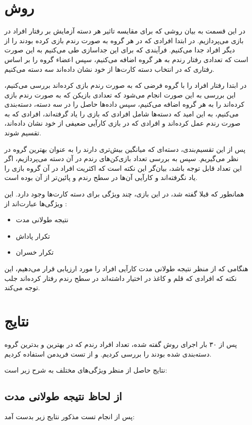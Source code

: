 \documentclass{article}
\begin{document}
\section{روش}
در این قسمت به بیان روشی که برای مقایسه تاثیر هر دسته آزمایش  بر رفتار افراد در بازی می‌پردازیم.
در ابتدا افرادی که در هر گروه به صورت رندم بازی کرده بودند را از دیگر افراد جدا می‌کنیم. فرآیندی که برای این جداسازی طی می‌کنیم به این صورت است که 
تعدادی رفتار رندم به هر گروه اضافه می‌کنیم، سپس اعضاء گروه را بر اساس رفتاری که در انتخاب دسته‌ کارت‌ها از خود نشان داده‌اند سه دسته می‌کنیم.

در ابتدا رفتار افراد را با گروه فرضی که به صورت رندم بازی کرده‌اند بررسی می‌کنیم، این بررسی به این صورت انجام می‌شود که 
تعدادی بازیکن که به صورت رندم بازی کرده‌اند را به هر گروه اضافه می‌کنیم، سپس داده‌ها حاصل را در سه دسته، دسته‌بندی می‌کنیم،
به این امید که دسته‌ها شامل افرادی که بازی را یاد گرفته‌اند، افرادی که به صورت رندم عمل کرده‌اند و افرادی که 
در بازی کارآیی ضعیفی از خود نشان داده‌اند، تقسیم شوند.

پس از این تقسیم‌بندی، دسته‌ای که میانگین بیش‌تری دارند را به عنوان بهترین گروه در نظر می‌گیریم.
سپس به بررسی تعداد بازی‌کن‌های رندم در آن دسته می‌پردازیم، اگر 
این تعداد قابل توجه باشد، بیان‌گر این نکته است که اکثریت افراد در آن گروه بازی را یاد نگرفته‌اند
 و کارآیی آن‌ها در سطح رندم و پائین‌تر از آن بوده است.


همانطور که قبلا گفته شد، در این بازی، چند ویژگی برای دسته کارت‌ها وجود دارد. این ویژگی‌ها عبارت‌اند از :
\begin{itemize}
 \item نتیجه طولانی مدت
\item تکرار پاداش‌
\item تکرار خسران‌
\end{itemize}

هنگامی که از منظر نتیجه طولانی مدت کارآیی افراد را مورد ارزیابی قرار می‌دهیم،
  این نکته که افرادی که قلم و کاغذ در اختیار داشته‌اند
در سطح رندم رفتار کرده‌اند جلب توجه می‌کند.


\section{نتایج}
پس از ۳۰ بار اجرای روش گفته شده، تعداد افراد رندم که در بهترین و بدترین گروه دسته‌بندی شده بودند را بررسی کردیم.
و از تست فریدمن استفاده کردیم.

نتایج حاصل از منظر ویژگی‌های مختلف به شرح زیر است:
\subsection{از لحاظ نتیجه طولانی مدت}
پس از انجام تست مذکور نتایج زیر بدست آمد:
\end{document}
